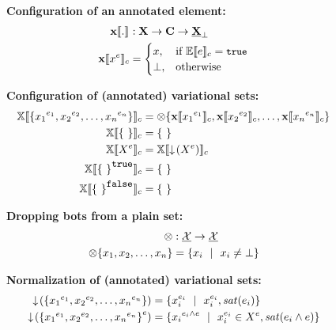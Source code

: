 \begin{figure}
%
\textbf{Configuration of an annotated element:}
\begin{alignat*}{1}
\xeSem [] . &: \elemSet \to \confSet \to \maybe \pelemSet\\
\xeSem {\annot \elem} &=
  \begin{cases}
    \elem, & \If \fSem {\dimMeta} = \t\\
    \bot, &\Otherwise    
  \end{cases}
\end{alignat*}

\medskip
\textbf{Configuration of (annotated) variational sets:}
\begin{alignat*}{1}
\osetSem {\setDef{\annot [\dimMeta_1] {\elem_1}, \annot [\dimMeta_2] {\elem_2}, \ldots, \annot [\dimMeta_n] {\elem_n}}} &= \dropbot {\setDef{\xeSem {\annot [\dimMeta_1] {\elem_1}}, 
\xeSem {\annot [\dimMeta_2] {\elem_2}}, \ldots, \xeSem {\annot [\dimMeta_n] {\elem_n}} }}\\
\osetSem {\setDef \ } &= \setDef \ \\
%
\osetSem {\annot {\vset}} &= \osetSem {\pushIn {\annot \vset}}\\
\osetSem {\annot [\t] {\setDef \ }} & = \setDef \ \\
\osetSem {\annot [\f] {\setDef \ }} & = \setDef \ 
\end{alignat*}

\medskip
\textbf{Dropping bots from a plain set:}
\begin{alignat*}{1}
\dropbot {} &: \psetSet \to \psetSet\\
\dropbot {\setDef {\elem_1, \elem_2, \ldots, \elem_n}} &= \setDef {\elem_i \myOR \elem_i \neq \bot}
\end{alignat*}

\medskip 
\textbf{Normalization of (annotated) variational sets:}
\begin{alignat*}{1}
\pushIn {\setDef {\annot [\dimMeta_1] {\elem_1}, \annot [\dimMeta_2] {\elem_2}, \ldots,
\annot [\dimMeta_n] {\elem_n}}} &= \setDef {
\annot [\dimMeta_i] \elem_i \myOR \annot [\dimMeta_i] \elem_i, \sat {\dimMeta_i}}\\
\pushIn {\annot {\setDef {\annot [\dimMeta_1] {\elem_1}, \annot [\dimMeta_2] {\elem_2}, \ldots,
\annot [\dimMeta_n] {\elem_n}}}} &= 
\setDef {\annot [\dimMeta_i \wedge \dimMeta] {\elem_i} \myOR 
\annot [\dimMeta_i] \elem_i \in \annot \vset, \sat {\dimMeta_i \wedge \dimMeta}}\\
\end{alignat*}


\end{figure}
